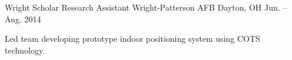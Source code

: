 \begin{cventries}
  \cventry
    {Wright Scholar Research Assistant} %
    {Wright-Patterson AFB} %
    {Dayton, OH} %
    {Jun. – Aug. 2014} %
    {
      \begin{cvitems} %
        \item {Led team developing prototype indoor positioning system using COTS technology.}
      \end{cvitems}
    }

\end{cventries}
